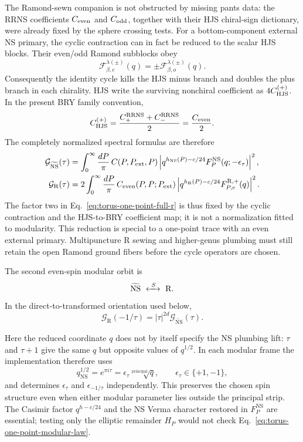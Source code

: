 \documentclass[11pt]{article}
\newcommand{\NS}{\mathrm{NS}}
\newcommand{\R}{\mathrm{R}}
\begin{document}
The Ramond-sewn companion is not obstructed by missing pants data: the
RRNS coefficients $C_{\rm even}$ and $C_{\rm odd}$, together with their HJS
chiral-sign dictionary, were already fixed by the sphere crossing tests.
For a bottom-component external NS primary, the cyclic contraction can in
fact be reduced to the scalar HJS blocks.  Their even/odd Ramond subblocks
obey
\begin{equation}
 \mathcal F_{\beta,e}^{\lambda(\pm)}(q)
 =\pm\mathcal F_{\beta,o}^{\lambda(\pm)}(q).
 \label{eq:torus-r-even-odd-identity}
\end{equation}
Consequently the identity cycle kills the HJS minus branch and doubles the
plus branch in each chirality.  HJS write the surviving nonchiral
coefficient as $4C_{\rm HJS}^{(+)}$.  In the present BRY family convention,
\[
 C_{\rm HJS}^{(+)}
 =\frac{C_+^{\R\R\NS}+C_-^{\R\R\NS}}2
 =\frac{C_{\rm even}}2.
\]
The completely normalized spectral formulas are therefore
\begin{align}
 \mathcal G_{\widetilde{\NS}}(\tau)
 &=\int_0^\infty\frac{dP}{\pi}\,
 C(P,P_{\rm ext},P)
 \left|
 q^{h_{\NS}(P)-c/24}
 F_P^{\NS}(q;-\epsilon_\tau)
 \right|^2,
 \label{eq:torus-one-point-full-nstilde}\\
 \mathcal G_{\R}(\tau)
 &=2\int_0^\infty\frac{dP}{\pi}\,
 C_{\rm even}(P,P;P_{\rm ext})
 \left|
 q^{h_{\R}(P)-c/24}
 F_{P,e}^{\R,+}(q)
 \right|^2.
 \label{eq:torus-one-point-full-r}
\end{align}
The factor two in Eq.~\eqref{eq:torus-one-point-full-r} is thus fixed by
the cyclic contraction and the HJS-to-BRY coefficient map; it is not a
normalization fitted to modularity.  This reduction is special to a
one-point trace with an even external primary.  Multipuncture R sewing and
higher-genus plumbing must still retain the open Ramond ground fibers before
the cycle operators are chosen.

The second even-spin modular orbit is
\begin{equation}
 \widetilde{\NS}\ \xleftrightarrow{\ S\ }\ \R .
 \label{eq:torus-nstilde-r-orbit}
\end{equation}
In the direct-to-transformed orientation used below,
\begin{equation}
 \mathcal G_{\R}(-1/\tau)
 =|\tau|^{2d}\mathcal G_{\widetilde{\NS}}(\tau).
 \label{eq:torus-nstilde-r-modular-law}
\end{equation}

Here the reduced coordinate $q$ does not by itself specify the NS plumbing
lift: $\tau$ and $\tau+1$ give the same $q$ but opposite values of
$q^{1/2}$.  In each modular frame the implementation therefore uses
\begin{equation}
 q_{\NS}^{1/2}=e^{\pi i\tau}
 =\epsilon_\tau\sqrt[\mathrm{principal}]{q},
 \qquad \epsilon_\tau\in\{+1,-1\},
 \label{eq:torus-ns-spin-lift}
\end{equation}
and determines $\epsilon_\tau$ and $\epsilon_{-1/\tau}$ independently.
This preserves the chosen spin structure even when either modular parameter
lies outside the principal strip.
The Casimir factor $q^{h-c/24}$ and the NS Verma character restored in
$F_P^{\NS}$ are essential; testing only the elliptic remainder $H_P$ would
not check Eq.~\eqref{eq:torus-one-point-modular-law}.
\end{document}
